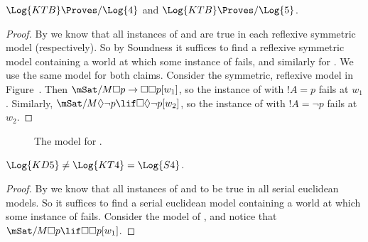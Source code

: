 \documentclass[../../../include/open-logic-section]{subfiles}
\begin{document}
\begin{thm}
  $\Log{KTB} \Proves/ \Log{4}$ and $\Log{KTB} \Proves/ \Log{5}$.
\end{thm}

\begin{proof}
  By  we know that all instances of
   and  are true in each reflexive symmetric model
  (respectively). So by Soundness it suffices to find a reflexive
  symmetric model containing a world at which some instance of
   fails, and similarly for .  We use the same
  model for both claims. Consider the symmetric, reflexive model in
  Figure~.  Then $\mSat/{M}{\Box p \to \Box \Box
    p}[w_1]$, so the instance of  with $!A =p$ fails at
  $w_1$. Similarly, $\mSat/{M}{\Diamond \lnot p \lif \Box \Diamond
    \lnot p}[w_2]$, so the instance of  with $!A = \lnot p$
  fails at $w_2$.
\end{proof}

\begin{figure}[htpb]
  \centering
  \caption{The model for .}
\end{figure}

\begin{thm}
  $\Log{KD5} \neq \Log{KT4} = \Log{S4}$.
\end{thm}

\begin{proof}
  By  we know that all instances of
   and  to be true in all serial euclidean models.
  So  it suffices to find a serial euclidean model containing a world
  at which some instance of  fails.  Consider the model of
  , and notice that $\mSat/{M}{\Box p
  \lif \Box\Box p}[w_1]$. 
\end{proof}
\end{document}
